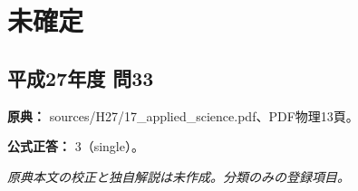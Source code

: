\section{未確定}

\subsection{平成27年度 問33}
\label{q:h27-reg-applied-33}

\noindent\textbf{原典：} sources/H27/17\_applied\_science.pdf、PDF物理13頁。

\textbf{公式正答：} 3（single）。

\par\textit{原典本文の校正と独自解説は未作成。分類のみの登録項目。}
